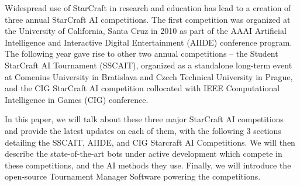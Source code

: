 Widespread use of StarCraft in research and education has lead to a creation of three annual StarCraft AI competitions. The first competition was organized at the University of California, Santa Cruz in 2010 as part of the AAAI Artificial Intelligence and Interactive Digital Entertainment (AIIDE) conference program. The following year gave rise to other two annual competitions -- the Student StarCraft AI Tournament (SSCAIT), organized as a standalone long-term event at Comenius University in Bratislava and Czech Technical University in Prague, and the CIG StarCraft AI competition collocated with IEEE Computational Intelligence in Games (CIG) conference.

In this paper, we will talk about these three major StarCraft AI competitions and provide the latest updates on each of them, with the following 3 sections detailing the SSCAIT, AIIDE, and CIG Starcraft AI Competitions. We will then describe the state-of-the-art bots under active development which compete in these competitions, and the AI methods they use. Finally, we will introduce the open-source Tournament Manager Software powering the competitions. 



